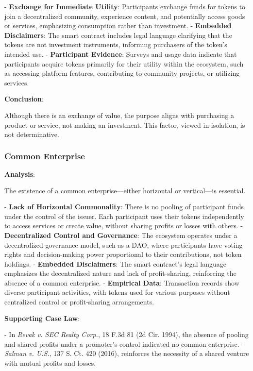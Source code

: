 \documentclass[a4paper,12pt]{article}
\begin{document}
- \textbf{Exchange for Immediate Utility}: Participants exchange funds for tokens to join a decentralized community, experience content, and potentially access goods or services, emphasizing consumption rather than investment.
- \textbf{Embedded Disclaimers}: The smart contract includes legal language clarifying that the tokens are not investment instruments, informing purchasers of the token's intended use.
- \textbf{Participant Evidence}: Surveys and usage data indicate that participants acquire tokens primarily for their utility within the ecosystem, such as accessing platform features, contributing to community projects, or utilizing services.

\textbf{Conclusion}:

Although there is an exchange of value, the purpose aligns with purchasing a product or service, not making an investment. This factor, viewed in isolation, is not determinative.

\subsubsection{Common Enterprise}
\textbf{Analysis}: 

The existence of a common enterprise—either horizontal or vertical—is essential.

- \textbf{Lack of Horizontal Commonality}: There is no pooling of participant funds under the control of the issuer. Each participant uses their tokens independently to access services or create value, without sharing profits or losses with others.
- \textbf{Decentralized Control and Governance}: The ecosystem operates under a decentralized governance model, such as a DAO, where participants have voting rights and decision-making power proportional to their contributions, not token holdings.
- \textbf{Embedded Disclaimers}: The smart contract's legal language emphasizes the decentralized nature and lack of profit-sharing, reinforcing the absence of a common enterprise.
- \textbf{Empirical Data}: Transaction records show diverse participant activities, with tokens used for various purposes without centralized control or profit-sharing arrangements.

\textbf{Supporting Case Law}:

- In \emph{Revak v. SEC Realty Corp.}, 18 F.3d 81 (2d Cir. 1994), the absence of pooling and shared profits under a promoter's control indicated no common enterprise.
- \emph{Salman v. U.S.}, 137 S. Ct. 420 (2016), reinforces the necessity of a shared venture with mutual profits and losses.
\end{document}
